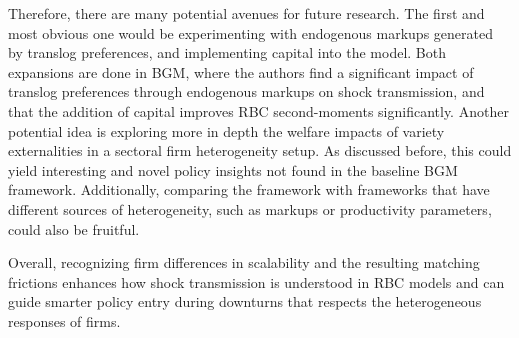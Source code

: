 \documentclass[a4paper,12pt]{article} %
\numberwithin{equation}{section} %
\numberwithin{figure}{section}
\numberwithin{table}{section}
\begin{document}
Therefore, there are many potential avenues for future research. The first and most obvious one would be experimenting with endogenous markups generated by
translog preferences, and implementing capital into the model. Both expansions are done in BGM, where the authors find a significant
impact of translog preferences through endogenous markups on shock transmission, and that the addition of capital improves RBC second-moments significantly.
Another potential idea is exploring more in depth the welfare impacts of variety externalities in a sectoral firm heterogeneity setup. As discussed before, 
this could yield interesting and novel policy insights not found in the baseline BGM framework. Additionally, comparing the framework with frameworks 
that have different sources of heterogeneity, such as markups or productivity parameters, could also be fruitful. 

Overall, recognizing firm differences in scalability and the resulting matching frictions enhances how 
shock transmission is understood in RBC models and can guide smarter policy entry during downturns that respects
the heterogeneous responses of firms. 



\newpage
\thispagestyle{plain}
\printbibliography[heading=bibintoc] %
\end{document}
